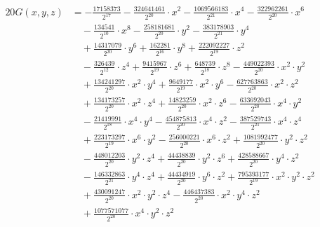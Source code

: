 \begin{align*}20G(x,y,z)&=-\frac{17158373}{2^{17}}-\frac{324641461}{2^{20}}\cdot x^{2}-\frac{1069566183}{2^{21}}\cdot x^{4}-\frac{322962261}{2^{20}}\cdot x^{6}\\
&\quad -\frac{134541}{2^{10}}\cdot x^{8}-\frac{258181681}{2^{20}}\cdot y^{2}-\frac{383178903}{2^{21}}\cdot y^{4}\\
&\quad +\frac{14317079}{2^{20}}\cdot y^{6}+\frac{162281}{2^{16}}\cdot y^{8}+\frac{222092227}{2^{19}}\cdot z^{2}\\
&\quad -\frac{326439}{2^{12}}\cdot z^{4}+\frac{9415967}{2^{19}}\cdot z^{6}+\frac{648739}{2^{18}}\cdot z^{8}-\frac{449022393}{2^{20}}\cdot x^{2}\cdot y^{2}\\
&\quad +\frac{134241297}{2^{20}}\cdot x^{2}\cdot y^{4}+\frac{9649177}{2^{19}}\cdot x^{2}\cdot y^{6}-\frac{627763863}{2^{20}}\cdot x^{2}\cdot z^{2}\\
&\quad +\frac{134173257}{2^{20}}\cdot x^{2}\cdot z^{4}+\frac{14823259}{2^{20}}\cdot x^{2}\cdot z^{6}-\frac{633692043}{2^{20}}\cdot x^{4}\cdot y^{2}\\
&\quad -\frac{21419991}{2^{18}}\cdot x^{4}\cdot y^{4}-\frac{454875813}{2^{20}}\cdot x^{4}\cdot z^{2}-\frac{387529743}{2^{21}}\cdot x^{4}\cdot z^{4}\\
&\quad +\frac{223173297}{2^{19}}\cdot x^{6}\cdot y^{2}-\frac{256000221}{2^{20}}\cdot x^{6}\cdot z^{2}+\frac{1081992477}{2^{20}}\cdot y^{2}\cdot z^{2}\\
&\quad -\frac{448012203}{2^{20}}\cdot y^{2}\cdot z^{4}+\frac{44438839}{2^{20}}\cdot y^{2}\cdot z^{6}+\frac{428588667}{2^{20}}\cdot y^{4}\cdot z^{2}\\
&\quad -\frac{146332863}{2^{21}}\cdot y^{4}\cdot z^{4}+\frac{44434919}{2^{20}}\cdot y^{6}\cdot z^{2}+\frac{795393177}{2^{19}}\cdot x^{2}\cdot y^{2}\cdot z^{2}\\
&\quad +\frac{430091247}{2^{20}}\cdot x^{2}\cdot y^{2}\cdot z^{4}-\frac{446437383}{2^{20}}\cdot x^{2}\cdot y^{4}\cdot z^{2}\\
&\quad +\frac{1077571077}{2^{20}}\cdot x^{4}\cdot y^{2}\cdot z^{2}\end{align*}

